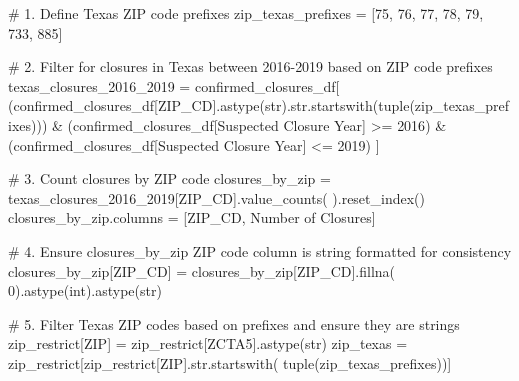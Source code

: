 \documentclass[
  letterpaper,
  DIV=11,
  numbers=noendperiod]{scrartcl}
\newenvironment{Shaded}{\begin{snugshade}}{\end{snugshade}}
\newcommand{\BuiltInTok}[1]{\textcolor[rgb]{0.00,0.23,0.31}{#1}}
\newcommand{\CommentTok}[1]{\textcolor[rgb]{0.37,0.37,0.37}{#1}}
\newcommand{\DecValTok}[1]{\textcolor[rgb]{0.68,0.00,0.00}{#1}}
\newcommand{\NormalTok}[1]{\textcolor[rgb]{0.00,0.23,0.31}{#1}}
\newcommand{\OperatorTok}[1]{\textcolor[rgb]{0.37,0.37,0.37}{#1}}
\newcommand{\StringTok}[1]{\textcolor[rgb]{0.13,0.47,0.30}{#1}}
\begin{document}
\begin{Shaded}
\begin{Highlighting}[]
\CommentTok{\# 1. Define Texas ZIP code prefixes}
\NormalTok{zip\_texas\_prefixes }\OperatorTok{=}\NormalTok{ [}\StringTok{\textquotesingle{}75\textquotesingle{}}\NormalTok{, }\StringTok{\textquotesingle{}76\textquotesingle{}}\NormalTok{, }\StringTok{\textquotesingle{}77\textquotesingle{}}\NormalTok{, }\StringTok{\textquotesingle{}78\textquotesingle{}}\NormalTok{, }\StringTok{\textquotesingle{}79\textquotesingle{}}\NormalTok{, }\StringTok{\textquotesingle{}733\textquotesingle{}}\NormalTok{, }\StringTok{\textquotesingle{}885\textquotesingle{}}\NormalTok{]}

\CommentTok{\# 2. Filter for closures in Texas between 2016{-}2019 based on ZIP code prefixes}
\NormalTok{texas\_closures\_2016\_2019 }\OperatorTok{=}\NormalTok{ confirmed\_closures\_df[}
\NormalTok{    (confirmed\_closures\_df[}\StringTok{\textquotesingle{}ZIP\_CD\textquotesingle{}}\NormalTok{].astype(}\BuiltInTok{str}\NormalTok{).}\BuiltInTok{str}\NormalTok{.startswith(}\BuiltInTok{tuple}\NormalTok{(zip\_texas\_prefixes))) }\OperatorTok{\&}
\NormalTok{    (confirmed\_closures\_df[}\StringTok{\textquotesingle{}Suspected Closure Year\textquotesingle{}}\NormalTok{] }\OperatorTok{\textgreater{}=} \DecValTok{2016}\NormalTok{) }\OperatorTok{\&}
\NormalTok{    (confirmed\_closures\_df[}\StringTok{\textquotesingle{}Suspected Closure Year\textquotesingle{}}\NormalTok{] }\OperatorTok{\textless{}=} \DecValTok{2019}\NormalTok{)}
\NormalTok{]}

\CommentTok{\# 3. Count closures by ZIP code}
\NormalTok{closures\_by\_zip }\OperatorTok{=}\NormalTok{ texas\_closures\_2016\_2019[}\StringTok{\textquotesingle{}ZIP\_CD\textquotesingle{}}\NormalTok{].value\_counts(}
\NormalTok{).reset\_index()}
\NormalTok{closures\_by\_zip.columns }\OperatorTok{=}\NormalTok{ [}\StringTok{\textquotesingle{}ZIP\_CD\textquotesingle{}}\NormalTok{, }\StringTok{\textquotesingle{}Number of Closures\textquotesingle{}}\NormalTok{]}

\CommentTok{\# 4. Ensure closures\_by\_zip ZIP code column is string formatted for consistency}
\NormalTok{closures\_by\_zip[}\StringTok{\textquotesingle{}ZIP\_CD\textquotesingle{}}\NormalTok{] }\OperatorTok{=}\NormalTok{ closures\_by\_zip[}\StringTok{\textquotesingle{}ZIP\_CD\textquotesingle{}}\NormalTok{].fillna(}
    \DecValTok{0}\NormalTok{).astype(}\BuiltInTok{int}\NormalTok{).astype(}\BuiltInTok{str}\NormalTok{)}

\CommentTok{\# 5. Filter Texas ZIP codes based on prefixes and ensure they are strings}
\NormalTok{zip\_restrict[}\StringTok{\textquotesingle{}ZIP\textquotesingle{}}\NormalTok{] }\OperatorTok{=}\NormalTok{ zip\_restrict[}\StringTok{\textquotesingle{}ZCTA5\textquotesingle{}}\NormalTok{].astype(}\BuiltInTok{str}\NormalTok{)}
\NormalTok{zip\_texas }\OperatorTok{=}\NormalTok{ zip\_restrict[zip\_restrict[}\StringTok{\textquotesingle{}ZIP\textquotesingle{}}\NormalTok{].}\BuiltInTok{str}\NormalTok{.startswith(}
    \BuiltInTok{tuple}\NormalTok{(zip\_texas\_prefixes))]}


\end{Highlighting}
\end{Shaded}
\end{document}
